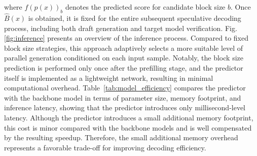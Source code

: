 \documentclass{article}
\begin{document}
where $f(p(x))_b$ denotes the predicted score for candidate block size $b$. Once $\hat{B}(x)$ is obtained, it is fixed for the entire subsequent speculative decoding process, including both draft generation and target model verification. Fig. \ref{fig:inference} presents an overview of the inference process. Compared to fixed block size strategies, this approach adaptively selects a more suitable level of parallel generation conditioned on each input sample. Notably, the block size prediction is performed only once after the prefilling stage, and the predictor itself is implemented as a lightweight network, resulting in minimal computational overhead. Table~\ref{tab:model_efficiency} compares the predictor with the backbone model in terms of parameter size, memory footprint, and inference latency, showing that the predictor introduces only millisecond-level latency. Although the predictor introduces a small additional memory footprint, this cost is minor compared with the backbone models and is well compensated by the resulting speedup. Therefore, the small additional memory overhead represents a favorable trade-off for improving decoding efficiency.
\end{document}
